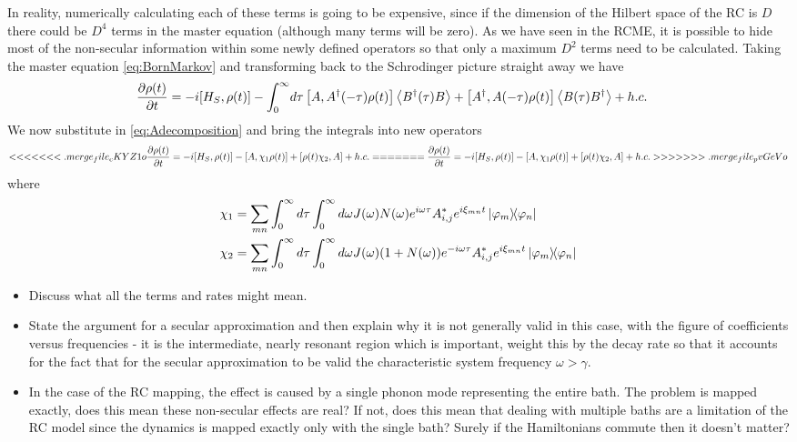 \documentclass[]{article}
\begin{document}
\begin{itemize}
\begin{itemize}
In reality, numerically calculating each of these terms is going to be expensive, since if the dimension of the Hilbert space of the RC is $D$ there could be $D^4$ terms in the master equation (although many terms will be zero). As we have seen in the RCME, it is possible to hide most of the non-secular information within some newly defined operators so that only a maximum $D^2$ terms need to be calculated. Taking the master equation \ref{eq:BornMarkov} and transforming back to the Schrodinger picture straight away we have
\begin{align}
	\begin{split}
		\label{eq:BornMarkovSchrod}
		\pdv{\rho(t)}{t} = -i[H_S, \rho(t)] - \int_{0}^{\infty}& d\tau  \left[A, A^{\dagger}(-\tau)\rho(t)\right] \expval{B^{\dagger}(\tau)B} + \left[A^{\dagger},A(-\tau)\rho(t)\right] \expval{B(\tau)B^{\dagger}} + h.c.
	\end{split}
\end{align}
We now substitute in \ref{eq:Adecomposition} and bring the integrals into new operators
\begin{align}
	\begin{split}
<<<<<<< .merge_file_cKYZ1o
		\pdv{\rho(t)}{t} = -i[H_S, \rho(t)] - \left[A, \chi_1 \rho(t)\right]  + \left[\rho(t)\chi_2,A\right] + h.c.
=======
		\pdv{\rho(t)}{t} = -i[H_S, \rho(t)] - \left[A, \chi_1\rho(t)\right]  + \left[\rho(t)\chi_2,A\right] + h.c.
>>>>>>> .merge_file_pvGeVo
	\end{split}
\end{align}
where 
\begin{align}
	\begin{split}
\chi_1 &= \sum_{m n}\int_{0}^{\infty}d\tau\int_{0}^{\infty}d\omega J(\omega)N(\omega)e^{i\omega\tau}A_{i,j}^* e^{i\xi_{mn}t}\dyad{\varphi_m}{\varphi_n} \\
\chi_2 &= \sum_{m n}\int_{0}^{\infty}d\tau\int_{0}^{\infty}d\omega J(\omega)(1+N(\omega))e^{-i\omega\tau}A_{i,j}^* e^{i\xi_{mn}t}\dyad{\varphi_m}{\varphi_n} 
	\end{split}
\end{align}

\begin{itemize}
	\item Discuss what all the terms and rates might mean.
	\item State the argument for a secular approximation and then explain why it is not generally valid in this case, with the figure of coefficients versus frequencies - it is the intermediate, nearly resonant region which is important, weight this by the decay rate so that it accounts for the fact that for the secular approximation to be valid the characteristic system frequency $\omega>\gamma$.
	\item In the case of the RC mapping, the effect is caused by a single phonon mode representing the entire bath. The problem is mapped exactly, does this mean these non-secular effects are real? If not, does this mean that dealing with multiple baths are a limitation of the RC model since the dynamics is mapped exactly only with the single bath? Surely if the Hamiltonians commute then it doesn't matter?
\end{itemize}



\end{itemize}
\end{itemize}
\end{document}
